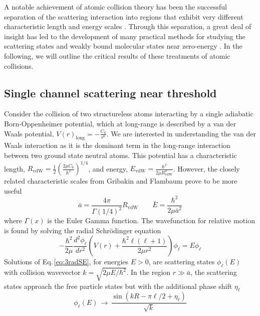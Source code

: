 A notable achievement of atomic collision theory has been the successful separation of the scattering interaction into regions that exhibit very different characteristic length and energy scales \cite{Julienne2009a}.
Through this separation, a great deal of insight has led to the development of many practical methods for studying the scattering states and weakly bound molecular states near zero-energy \cite{wbz99,Gao01,gao04,Bohn1999,Julienne2009a,Vogels1998,Moerdijk1995,Julienne1989}.
In the following, we will outline the critical results of these treatments of atomic collisions.

\subsection{Single channel scattering near threshold} \label{ssec:low_energy}
Consider the collision of two structureless atoms interacting by a single adiabatic Born-Oppenheimer potential, which at long-range is described by a van der Waals potential, $V(r)_{\text{long}} = -\frac{C_6}{r^6}$.
We are interested in understanding the van der Waals interaction as it is the dominant term in the long-range interaction between two ground state neutral atoms.
This potential has a characteristic length, $R_{\mathrm{vdW}} = \frac{1}{2} \left(\frac{2 \mu C_6}{\hbar^2}\right)^{1/4}$, and energy, $E_\mathrm{vdW}=\frac{\hbar^2}{2\mu R_{\mathrm{vdW}}^2}$.
However, the closely related characteristic scales from Gribakin and Flambaum \cite{Boisseau2000a,gfl93} prove to be more useful 
\begin{equation}
	\bar{a} = \frac{4 \pi}{\Gamma(1/4)^2}R_{\mathrm{vdW}} \quad\quad \bar{E}=\frac{\hbar^2}{2\mu\bar{a}^2}
\end{equation}
where $\Gamma(x)$ is the Euler Gamma function.
The wavefunction for relative motion is found by solving the radial Schr\"{o}dinger equation
\begin{equation} \label{eq:3radSE}
	-\frac{\hbar^2}{2 \mu}\frac{d^2 \phi_{\ell}}{dr^2} \left( V(r) + \frac{\hbar^2\ell(\ell+1)}{2\mu r^2} \right) \phi_{\ell}=E\phi_{\ell}
\end{equation}
Solutions of Eq.\,\ref{eq:3radSE}, for energies $E>0$, are scattering states $\phi_{\ell}(E)$ with collision wavevector $k=\sqrt{2\mu E/\hbar^2}$.
In the region $r\gg\bar{a}$, the scattering states approach the free particle states but with the additional phase shift $\eta_\ell$
\begin{equation} \label{eq:3asymwf}
	\phi_{\ell}(E)\,\rightarrow\,\frac{\sin(kR-\pi\ell/2+\eta_{\ell})}{\sqrt{k}}
\end{equation}
